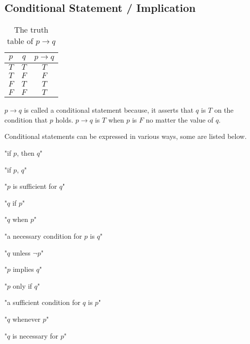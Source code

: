\documentclass[12pt letter]{report}
\begin{document}
\subsection{Conditional Statement / Implication}


\begin{table}[h!]
  \caption{The truth table of $p \to  q$}\label{tab:5}
  \begin{center}
    \begin{tabular}{|c c|c|}
      \hline
      $p$ & $q$ & $p \to q$ \\[0.5ex]
      \hline
      \hline
      $T$ & $T$ & $T$       \\
      $T$ & $F$ & $F$       \\
      $F$ & $T$ & $T$       \\
      $F$ & $F$ & $T$       \\
      \hline
    \end{tabular}
  \end{center}
\end{table}

$p \to q$ is called a conditional statement because, it asserts that $q$ is $T$ on the condition that $p$ holds.
$p \to q$ is $T$ when $p$ is $F$ no matter the value of $q$.

Conditional statements can be expressed in various ways, some are listed below.

"if $p$, then $q$"

"if $p$, $q$"

"$p$ is sufficient for $q$"

"$q$ if $p$"

"$q$ when $p$"

"a necessary condition for $p$ is $q$"

"$q$ unless $\neg p$"


"$p$ implies $q$"

"$p$ only if $q$"

"a sufficient condition for $q$ is $p$"

"$q$ whenever $p$"

"$q$ is necessary for $p$"
\end{document}
